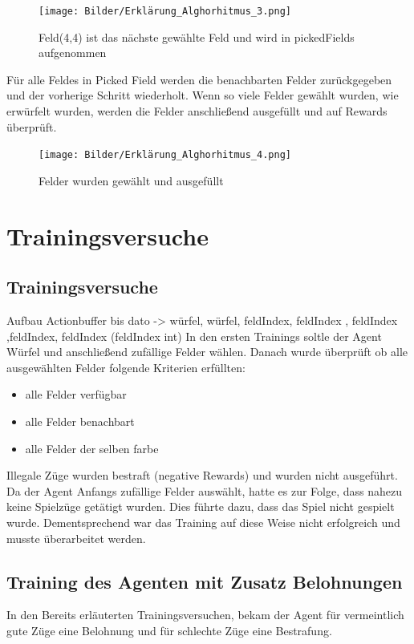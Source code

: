 \begin{figure}[!h]
	\centering
	\texttt{[image: Bilder/Erklärung\_Alghorhitmus\_3.png]}
	\caption{Feld(4,4) ist das nächste gewählte Feld und wird in pickedFields aufgenommen}
\end{figure}

Für alle Feldes in Picked Field werden die benachbarten Felder zurückgegeben und der vorherige Schritt wiederholt.
Wenn so viele Felder gewählt wurden, wie erwürfelt wurden, werden die Felder anschließend ausgefüllt und auf Rewards überprüft.

\begin{figure}[!h]
	\centering
	\texttt{[image: Bilder/Erklärung\_Alghorhitmus\_4.png]}
	\caption{Felder wurden gewählt und ausgefüllt}
\end{figure}


\newpage


\section{Trainingsversuche}
\subsection{Trainingsversuche}

Aufbau Actionbuffer bis dato -> würfel, würfel, feldIndex, feldIndex , feldIndex ,feldIndex, feldIndex (feldIndex int)
In den ersten Trainings soltle der Agent Würfel und anschließend zufällige Felder wählen.
Danach wurde überprüft ob alle ausgewählten Felder folgende Kriterien erfüllten:
\begin{itemize}
\item alle Felder verfügbar
\item alle Felder benachbart
\item alle Felder der selben farbe
\end{itemize}

Illegale Züge wurden bestraft (negative Rewards) und wurden nicht ausgeführt.
Da der Agent Anfangs zufällige Felder auswählt, hatte es zur Folge, dass nahezu keine Spielzüge getätigt wurden.
Dies führte dazu, dass das Spiel nicht gespielt wurde.
Dementsprechend war das Training auf diese Weise nicht erfolgreich und musste überarbeitet werden.


\subsection{Training des Agenten mit Zusatz Belohnungen}
In den Bereits erläuterten Trainingsversuchen, bekam der Agent für vermeintlich gute Züge eine Belohnung und für schlechte Züge eine Bestrafung.

